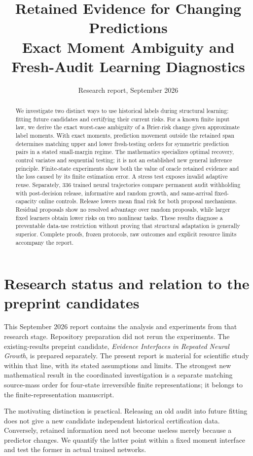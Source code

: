 \documentclass[11pt]{article}
\title{Retained Evidence for Changing Predictions\\[4pt]
\large Exact Moment Ambiguity and Fresh-Audit Learning Diagnostics}
\date{Research report, September 2026}
\begin{document}
\maketitle
\begin{abstract}
We investigate two distinct ways to use historical labels during structural
learning: fitting future candidates and certifying their current risks.
For a known finite input law, we derive the exact worst-case ambiguity of a
Brier-risk change given approximate label moments. With exact moments,
prediction movement outside the retained span determines matching upper and
lower fresh-testing orders for symmetric prediction pairs in a stated
small-margin regime. The mathematics
specializes optimal recovery, control variates and sequential testing; it is
not an established new general inference principle. Finite-state experiments
show both the value of oracle retained evidence and the loss caused by its
finite estimation error. A stress test exposes invalid adaptive reuse.
Separately, 336 trained neural trajectories compare permanent audit withholding
with post-decision release, informative and random growth, and same-arrival
fixed-capacity online controls. Release lowers mean final risk for both
proposal mechanisms. Residual proposals show no resolved advantage over
random proposals, while larger fixed learners obtain lower risks on two
nonlinear tasks. These results diagnose a preventable data-use restriction
without proving that structural adaptation is generally superior. Complete
proofs, frozen protocols, raw outcomes and explicit resource limits accompany
the report.
\end{abstract}

\section*{Research status and relation to the preprint candidates}
This September 2026 report contains the analysis and experiments from that
research stage. Repository preparation did not rerun the experiments.
The existing-results preprint candidate, \emph{Evidence Interfaces in Repeated
Neural Growth}, is prepared separately. The present report is material for
scientific study within that line, with its stated assumptions and limits.
The strongest new mathematical result in the coordinated investigation is
a separate matching source-mass order for four-state irreversible finite
representations; it belongs to the finite-representation manuscript.

The motivating distinction is practical. Releasing an old audit into future
fitting does not give a new candidate independent historical certification
data. Conversely, retained information need not become useless merely because
a predictor changes. We quantify the latter point within a fixed moment
interface and test the former in actual trained networks.
\end{document}
